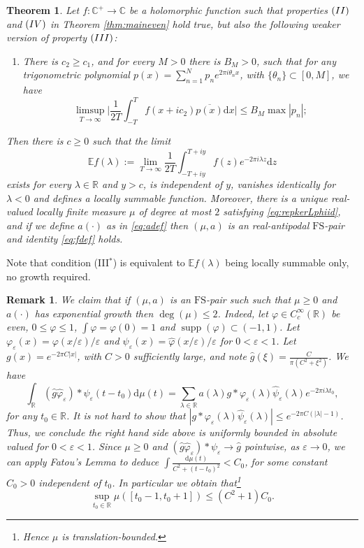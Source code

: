 \documentclass[a4paper,reqno,12pt]{amsart}
\DeclareMathOperator{\supp}{\mathrm{supp}}
\newtheorem{theorem}{Theorem}
\newtheorem{remark}{Remark}
\newcommand{\E}{\mathcal{E}}
\renewcommand{\H}{\mathbb{C}^+}
\renewcommand{\r}{\mathbb{R}}
\newcommand{\cp}{\mathbb{C}} %
\newcommand{\ft}{\widehat}
\newcommand{\la}{\lambda}
\newcommand{\ep}{\varepsilon}
\newcommand{\p}{\varphi}
\renewcommand{\d}{\mathrm{d}}
\newcommand{\1}{{\bf 1}}
\newcommand{\fs}{\mathrm{FS}}
\renewcommand{\E}{\mathbb{E}}
\newcommand{\ov}[1]{\overline{#1}}
\renewcommand{\1}{{\bo 1}}
\renewcommand{\a}{a(\cdot)}
\begin{document}
\begin{theorem}\label{cor:1}
Let $f:\H \to \cp$ be a holomorphic function such that properties $({\rm II})$ and $({\rm IV})$ in Theorem \ref{thm:maineven} hold true, but also the following weaker version of property $({\rm III})$: 
\begin{enumerate}
\item[(III$^*$)] There is $c_2\geq c_1$, and for every $M>0$ there is $B_M>0$, such that for any trigonometric polynomial $p(x)=\sum_{n=1}^N p_n e^{2\pi i \theta_n x}$, with $\{\theta_n\} \subset [0,M]$, we have
$$
\limsup_{T\to\infty} \bigg|\frac{1}{2T}\int_{-T}^T f(x+ic_2)\ov{p(x)}\d x\bigg| \leq B_M \max |p_n|;
$$
\end{enumerate}
Then there is $c\geq 0$ such that the limit
$$
\E f(\la) := \lim_{T\to\infty} \frac{1}{2T}\int_{-T+iy}^{T+iy} f(z)e^{-2\pi i \la z}\d z
$$
exists for every $\la\in\r$ and $y>c$, is independent of $y$, vanishes identically for $\la<0$ and defines a locally summable function. Moreover, there is a unique real-valued locally finite measure $\mu$ of degree at most $2$ satisfying \eqref{eq:repkerLphiid}, and if we define $\a$ as in \eqref{eq:adef} then $(\mu,a)$ is an real-antipodal $\fs$-pair and identity \eqref{eq:fdef} holds.
\end{theorem}

Note that condition (III$^*$) is equivalent to $\E f(\la)$ being locally summable only, no growth required.

\begin{remark}\label{rem:exptodeg2}
We claim that if $(\mu,a)$ is an $\fs$-pair such such that $\mu\geq 0$ and $\a$ has exponential growth then $\deg(\mu)\leq 2$. Indeed, let $\p\in C^\infty_c(\r)$ be even, $0\leq \p \leq 1$, $\int \p =\p(0)=1$ and $\supp(\p) \subset (-1,1)$. Let $\p_\ep(x)=\p(x/\ep)/\ep$ and $\psi_\ep(x)=\ft \p(x/\ep)/\ep$ for $0<\ep <1$. Let $g(x)=e^{-2 \pi C |x|}$, with $C>0$ sufficiently large, and note $\ft g(\xi) = \frac{C}{\pi(C^2+\xi^2)}$. We have
$$
\int_\r (\ft g \ft \p_\ep)*\psi_\ep(t-t_0)\d \mu(t) = \sum_{\la \in \r} a(\la)g * \p_\ep(\la)\ft \psi_\ep(\la)e^{-2\pi i \la t_0 },
$$
for any $t_0\in \r$. It is not hard to show that $|g * \p_\ep(\la)\ft \psi_\ep(\la)| \leq e^{-2 \pi C (|\la|-1)}$. Thus, we conclude the right hand side above is uniformly bounded in absolute valued for $0<\ep<1$. Since $\mu\geq 0$ and $(\ft g \ft \p_\ep)*\psi_\ep \to \ft g$ pointwise, as $\ep\to 0$, we can apply Fatou's Lemma to deduce $\int \frac{\d \mu(t)}{C^2+(t-t_0)^2}<C_0$, for some constant $C_0>0$ independent of $t_0$. In particular we obtain that\footnote{Hence $\mu$ is translation-bounded.}
$$
\sup_{t_0\in \r} \mu([t_0-1,t_0+1])\leq (C^2+1)C_0.
$$
\end{remark}
\end{document}
